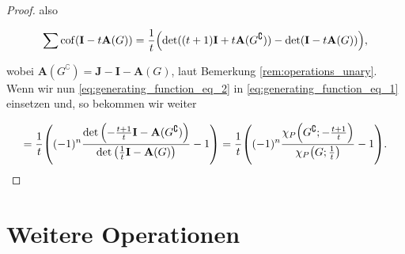 \begin{proof}
                also

                \begin{align} \label{eq:generating_function_eq_2}
                    \sum \operatorname{cof}(\mathbf I - t \mathbf A(G))
                    =
                    \frac{1}{t}
                    {\left ( 
                        \det((t+1) \mathbf I + t \mathbf A(G^\complement))
                        -
                        \det(\mathbf I - t \mathbf A(G))
                     \right )},
                \end{align}

                wobei $\mathbf A(G^\complement) = \mathbf J - \mathbf I - \mathbf A(G)$, laut Bemerkung \ref{rem:operations_unary}.
                Wenn wir nun \eqref{eq:generating_function_eq_2} in \eqref{eq:generating_function_eq_1} einsetzen und, so bekommen wir weiter

                \begin{align*}
                    =
                    \frac{1}{t}
                    {\left ( 
                        (-1)^n
                        \frac
                        {
                            \det
                            {\left ( 
                                -\frac{t+1}{t} \mathbf I - \mathbf A(G^\complement)
                             \right )}
                        }{
                            \det
                            {\left ( 
                                \frac{1}{t} \mathbf I - \mathbf A(G)
                             \right )}
                        }
                        -
                        1
                     \right )}
                    =
                    \frac{1}{t}
                    {\left ( 
                        (-1)^n
                        \frac
                        {
                            \chi_P
                            {\left ( 
                                G^\complement;
                                -\frac{t+1}{t}
                             \right )}
                        }{
                            \chi_P
                            {\left ( 
                                G;
                                \frac{1}{t}
                             \right )}
                        }
                        -
                        1
                     \right )}.
                \end{align*}

            \end{proof}

    \section{Weitere Operationen}
